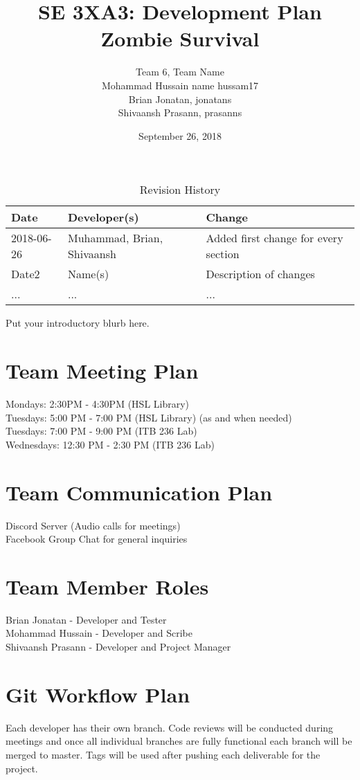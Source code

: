 \documentclass{article}
\title{SE 3XA3: Development Plan\\Zombie Survival}
\author{Team 6, Team Name
		\\ Mohammad Hussain name hussam17
		\\ Brian Jonatan,  jonatans
		\\ Shivaansh Prasann, prasanns
}
\date{September 26, 2018}
\begin{document}
\begin{table}[hp]
\caption{Revision History} \label{TblRevisionHistory}
\begin{tabularx}{\textwidth}{llX}
\toprule
\textbf{Date} & \textbf{Developer(s)} & \textbf{Change}\\
\midrule
2018-06-26 & Muhammad, Brian, Shivaansh & Added first change for every section\\
Date2 & Name(s) & Description of changes\\
... & ... & ...\\
\bottomrule
\end{tabularx}
\end{table}

\newpage

\maketitle

Put your introductory blurb here.

\section{Team Meeting Plan}
Mondays: 2:30PM - 4:30PM (HSL Library)\\
Tuesdays: 5:00 PM - 7:00 PM (HSL Library) (as and when needed)\\
Tuesdays: 7:00 PM - 9:00 PM (ITB 236 Lab)\\
Wednesdays: 12:30 PM - 2:30 PM (ITB 236 Lab)

\section{Team Communication Plan}
Discord Server (Audio calls for meetings)\\
Facebook Group Chat for general inquiries

\section{Team Member Roles}
Brian Jonatan - Developer and Tester\\
Mohammad Hussain - Developer and Scribe\\
Shivaansh Prasann - Developer and Project Manager

\section{Git Workflow Plan}
Each developer has their own branch. Code reviews will be conducted during meetings and once all individual branches are fully functional each branch will be merged to master. Tags will be used after pushing each deliverable for the project.
\end{document}

